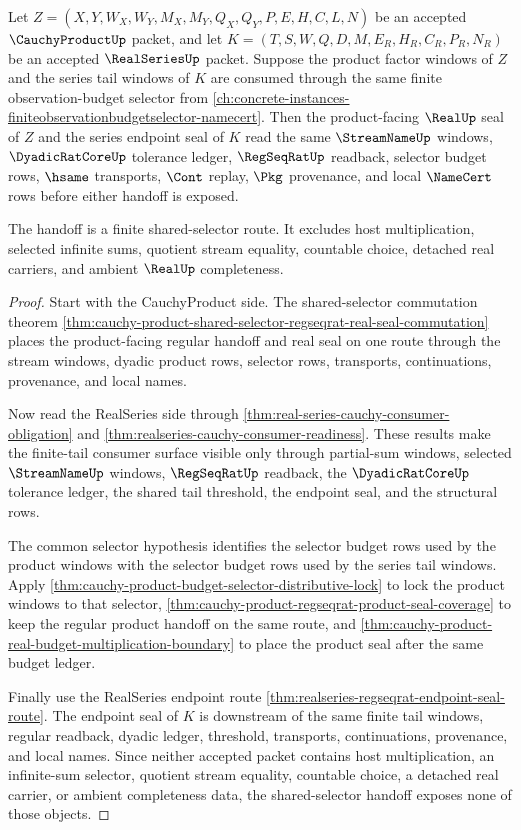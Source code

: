 \begin{theorem}
\label{thm:cauchy-product-realseries-shared-selector-handoff}
Let $Z=(X,Y,W_X,W_Y,M_X,M_Y,Q_X,Q_Y,P,E,H,C,L,N)$ be an accepted $\CauchyProductUp$ packet, and let $K=(T,S,W,Q,D,M,E_R,H_R,C_R,P_R,N_R)$ be an accepted $\RealSeriesUp$ packet. Suppose the product factor windows of $Z$ and the series tail windows of $K$ are consumed through the same finite observation-budget selector from \autoref{ch:concrete-instances-finiteobservationbudgetselector-namecert}. Then the product-facing $\RealUp$ seal of $Z$ and the series endpoint seal of $K$ read the same $\StreamNameUp$ windows, $\DyadicRatCoreUp$ tolerance ledger, $\RegSeqRatUp$ readback, selector budget rows, $\hsame$ transports, $\Cont$ replay, $\Pkg$ provenance, and local $\NameCert$ rows before either handoff is exposed.

The handoff is a finite shared-selector route. It excludes host multiplication, selected infinite sums, quotient stream equality, countable choice, detached real carriers, and ambient $\RealUp$ completeness.
\end{theorem}
\begin{proof}
Start with the CauchyProduct side. The shared-selector commutation theorem \autoref{thm:cauchy-product-shared-selector-regseqrat-real-seal-commutation} places the product-facing regular handoff and real seal on one route through the stream windows, dyadic product rows, selector rows, transports, continuations, provenance, and local names.

Now read the RealSeries side through \autoref{thm:real-series-cauchy-consumer-obligation} and \autoref{thm:realseries-cauchy-consumer-readiness}. These results make the finite-tail consumer surface visible only through partial-sum windows, selected $\StreamNameUp$ windows, $\RegSeqRatUp$ readback, the $\DyadicRatCoreUp$ tolerance ledger, the shared tail threshold, the endpoint seal, and the structural rows.

The common selector hypothesis identifies the selector budget rows used by the product windows with the selector budget rows used by the series tail windows. Apply \autoref{thm:cauchy-product-budget-selector-distributive-lock} to lock the product windows to that selector, \autoref{thm:cauchy-product-regseqrat-product-seal-coverage} to keep the regular product handoff on the same route, and \autoref{thm:cauchy-product-real-budget-multiplication-boundary} to place the product seal after the same budget ledger.

Finally use the RealSeries endpoint route \autoref{thm:realseries-regseqrat-endpoint-seal-route}. The endpoint seal of $K$ is downstream of the same finite tail windows, regular readback, dyadic ledger, threshold, transports, continuations, provenance, and local names. Since neither accepted packet contains host multiplication, an infinite-sum selector, quotient stream equality, countable choice, a detached real carrier, or ambient completeness data, the shared-selector handoff exposes none of those objects.
\end{proof}

